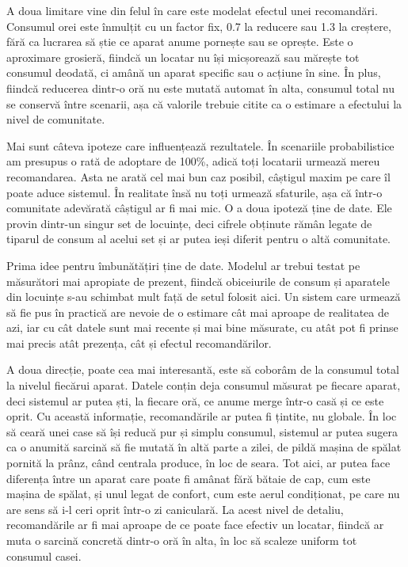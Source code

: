 \documentclass[12pt,a4paper]{report}
\begin{document}
A doua limitare vine din felul în care este modelat efectul unei recomandări. Consumul orei este înmulțit cu un factor fix, 0.7 la reducere sau 1.3 la creștere, fără ca lucrarea să știe ce aparat anume pornește sau se oprește. Este o aproximare grosieră, fiindcă un locatar nu își micșorează sau mărește tot consumul deodată, ci amână un aparat specific sau o acțiune în sine. În plus, fiindcă reducerea dintr-o oră nu este mutată automat în alta, consumul total nu se conservă între scenarii, așa că valorile trebuie citite ca o estimare a efectului la nivel de comunitate.

Mai sunt câteva ipoteze care influențează rezultatele. În scenariile probabilistice am presupus o rată de adoptare de 100\%, adică toți locatarii urmează mereu recomandarea. Asta ne arată cel mai bun caz posibil, câștigul maxim pe care îl poate aduce sistemul. În realitate însă nu toți urmează sfaturile, așa că într-o comunitate adevărată câștigul ar fi mai mic. O a doua ipoteză ține de date. Ele provin dintr-un singur set de locuințe, deci cifrele obținute rămân legate de tiparul de consum al acelui set și ar putea ieși diferit pentru o altă comunitate.

Prima idee pentru îmbunătățiri ține de date. Modelul ar trebui testat pe măsurători mai apropiate de prezent, fiindcă obiceiurile de consum și aparatele din locuințe s-au schimbat mult față de setul folosit aici. Un sistem care urmează să fie pus în practică are nevoie de o estimare cât mai aproape de realitatea de azi, iar cu cât datele sunt mai recente și mai bine măsurate, cu atât pot fi prinse mai precis atât prezența, cât și efectul recomandărilor.

A doua direcție, poate cea mai interesantă, este să coborâm de la consumul total la nivelul fiecărui aparat. Datele conțin deja consumul măsurat pe fiecare aparat, deci sistemul ar putea ști, la fiecare oră, ce anume merge într-o casă și ce este oprit. Cu această informație, recomandările ar putea fi țintite, nu globale. În loc să ceară unei case să își reducă pur și simplu consumul, sistemul ar putea sugera ca o anumită sarcină să fie mutată în altă parte a zilei, de pildă mașina de spălat pornită la prânz, când centrala produce, în loc de seara. Tot aici, ar putea face diferența între un aparat care poate fi amânat fără bătaie de cap, cum este mașina de spălat, și unul legat de confort, cum este aerul condiționat, pe care nu are sens să i-l ceri oprit într-o zi caniculară. La acest nivel de detaliu, recomandările ar fi mai aproape de ce poate face efectiv un locatar, fiindcă ar muta o sarcină concretă dintr-o oră în alta, în loc să scaleze uniform tot consumul casei.
\end{document}
